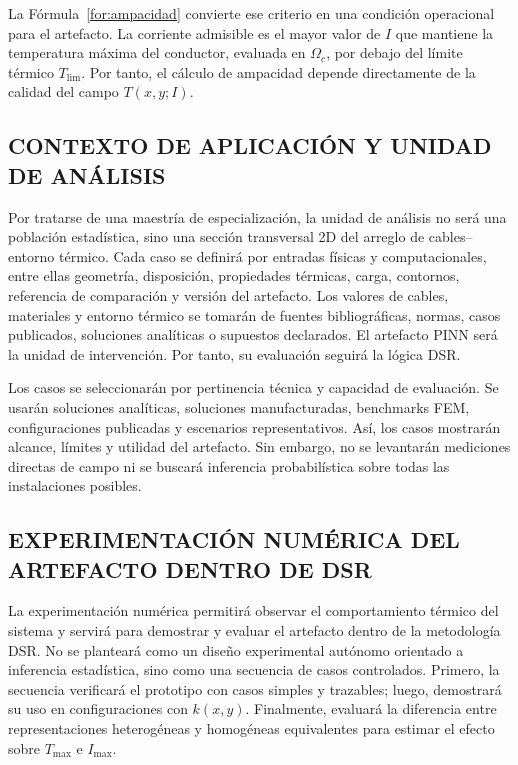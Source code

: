 \documentclass[11pt,a4paper,oneside]{report}
\newcommand{\Tmax}{T_{\max}}
\newcommand{\Imax}{I_{\max}}
\newcommand{\kx}{k(x,y)}
\begin{document}
La Fórmula~\ref{for:ampacidad} convierte ese criterio en una condición operacional para el artefacto. La corriente admisible es el mayor valor de $I$ que mantiene la temperatura máxima del conductor, evaluada en $\Omega_c$, por debajo del límite térmico $T_{\mathrm{lim}}$. Por tanto, el cálculo de ampacidad depende directamente de la calidad del campo $T(x,y;I)$.

\subsection{CONTEXTO DE APLICACIÓN Y UNIDAD DE ANÁLISIS}
\label{subsec:unidad-analisis}

Por tratarse de una maestría de especialización, la unidad de análisis no será una población estadística, sino una sección transversal 2D del arreglo de cables--entorno térmico. Cada caso se definirá por entradas físicas y computacionales, entre ellas geometría, disposición, propiedades térmicas, carga, contornos, referencia de comparación y versión del artefacto. Los valores de cables, materiales y entorno térmico se tomarán de fuentes bibliográficas, normas, casos publicados, soluciones analíticas o supuestos declarados. El artefacto PINN será la unidad de intervención. Por tanto, su evaluación seguirá la lógica DSR.

Los casos se seleccionarán por pertinencia técnica y capacidad de evaluación. Se usarán soluciones analíticas, soluciones manufacturadas, benchmarks FEM, configuraciones publicadas y escenarios representativos. Así, los casos mostrarán alcance, límites y utilidad del artefacto. Sin embargo, no se levantarán mediciones directas de campo ni se buscará inferencia probabilística sobre todas las instalaciones posibles.

\subsection{EXPERIMENTACIÓN NUMÉRICA DEL ARTEFACTO DENTRO DE DSR}

La experimentación numérica permitirá observar el comportamiento térmico del sistema y servirá para demostrar y evaluar el artefacto dentro de la metodología DSR. No se planteará como un diseño experimental autónomo orientado a inferencia estadística, sino como una secuencia de casos controlados. Primero, la secuencia verificará el prototipo con casos simples y trazables; luego, demostrará su uso en configuraciones con $\kx$. Finalmente, evaluará la diferencia entre representaciones heterogéneas y homogéneas equivalentes para estimar el efecto sobre $\Tmax$ e $\Imax$.
\end{document}
